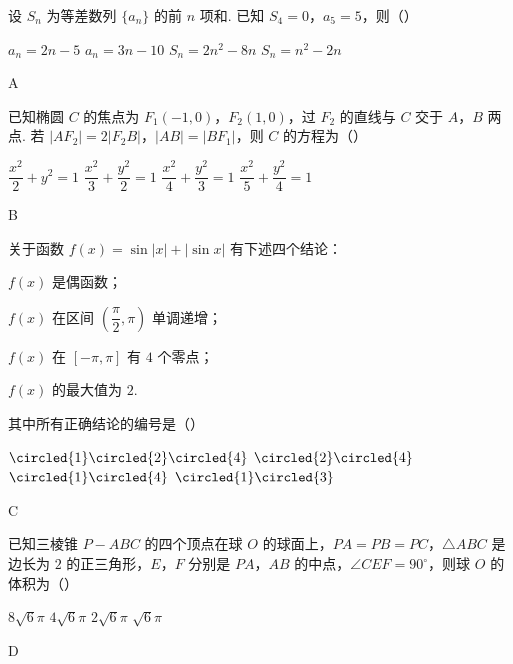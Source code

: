 \begin{problem}
设 \(S_n\) 为等差数列 \(\{a_n\}\) 的前 \(n\) 项和. 已知 \(S_4=0\)，\(a_5=5\)，则（\quad）

\choices
    {\(a_n=2n-5\)}
    {\(a_n=3n-10\)}
    {\(S_n=2n^2-8n\)}
    {\(S_n=n^2-2n\)}

\begin{answer}
A
\end{answer}
\end{problem}

\begin{problem}
已知椭圆 \(C\) 的焦点为 \(F_1(-1,0)\)，\(F_2(1,0)\)，过 \(F_2\) 的直线与 \(C\) 交于 \(A\)，\(B\) 两点. 若 \(|AF_2|=2|F_2B|\)，\(|AB|=|BF_1|\)，则 \(C\) 的方程为（\quad）

\choices
    {\(\dfrac{x^2}{2}+y^2=1\)}
    {\(\dfrac{x^2}{3}+\dfrac{y^2}{2}=1\)}
    {\(\dfrac{x^2}{4}+\dfrac{y^2}{3}=1\)}
    {\(\dfrac{x^2}{5}+\dfrac{y^2}{4}=1\)}

\begin{answer}
B
\end{answer}
\end{problem}

\begin{problem}
关于函数 \(f(x)=\sin|x|+|\sin x|\) 有下述四个结论：

\begin{circlelist}
\item \(f(x)\) 是偶函数；

\item \(f(x)\) 在区间 \(\left(\dfrac{\pi}{2},\pi\right)\) 单调递增；

\item \(f(x)\) 在 \([-\pi,\pi]\) 有 \(4\) 个零点；

\item \(f(x)\) 的最大值为 \(2\).
\end{circlelist}

其中所有正确结论的编号是（\quad）

\choices
    {\(\circled{1}\circled{2}\circled{4}\)}
    {\(\circled{2}\circled{4}\)}
    {\(\circled{1}\circled{4}\)}
    {\(\circled{1}\circled{3}\)}

\begin{answer}
C
\end{answer}
\end{problem}

\begin{problem}
已知三棱锥 \(P-ABC\) 的四个顶点在球 \(O\) 的球面上，\(PA=PB=PC\)，\(\triangle ABC\) 是边长为 \(2\) 的正三角形，\(E\)，\(F\) 分别是 \(PA\)，\(AB\) 的中点，\(\angle CEF=90^\circ\)，则球 \(O\) 的体积为（\quad）

\choices
    {\(8\sqrt6\pi\)}
    {\(4\sqrt6\pi\)}
    {\(2\sqrt6\pi\)}
    {\(\sqrt6\pi\)}

\begin{answer}
D
\end{answer}
\end{problem}

